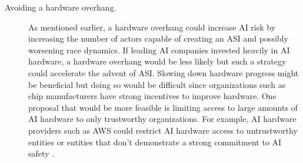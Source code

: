 \documentclass{article}
\begin{document}
\begin{description}
\item[Avoiding a hardware overhang.] As mentioned earlier, a hardware overhang could increase AI risk by increasing the number of actors capable of creating an ASI and possibly worsening race dynamics. If leading AI companies invested heavily in AI hardware, a hardware overhang would be less likely but such a strategy could accelerate the advent of ASI. Slowing down hardware progress might be beneficial but doing so would be difficult since organizations such as chip manufacturers have strong incentives to improve hardware. One proposal that would be more feasible is limiting access to large amounts of AI hardware to only trustworthy organizations. For example, AI hardware providers such as AWS could restrict AI hardware access to untrustworthy entities or entities that don’t demonstrate a strong commitment to AI safety \cite{parler}.
\end{description}

\printbibliography
\end{document}
